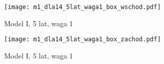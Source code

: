 \documentclass[inzynierska]{pwr_wmat_praca_dyplomowa}
\theoremstyle{plain}
\numberwithin{theorem}{chapter}
\theoremstyle{definition}
\numberwithin{theorem}{chapter}
\begin{document}
\begin{figure}[t]
	\hspace*{-3cm}  
	\texttt{[image: m1\_dla14\_5lat\_waga1\_box\_wschod.pdf]}
	\caption{Model I, 5 lat, waga 1}
	\centering
\end{figure}

\begin{figure}[t]
	\hspace*{-3cm}  
	\texttt{[image: m1\_dla14\_5lat\_waga1\_box\_zachod.pdf]}
	\caption{Model I, 5 lat, waga 1}
	\centering
\end{figure}
\end{document}
